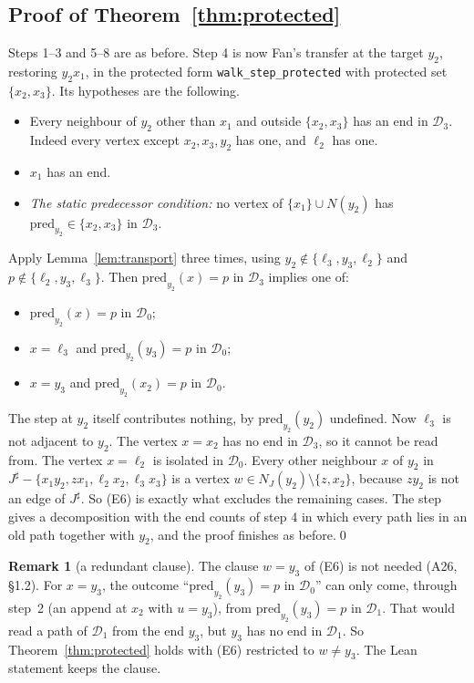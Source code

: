\documentclass[11pt]{amsart}
\theoremstyle{definition}
\newtheorem{remark}[theorem]{Remark}
\newcommand{\cD}{\mathcal D}
\newcommand{\sh}{{\sharp}}
\begin{document}
\subsection*{Proof of Theorem~\ref{thm:protected}}
Steps 1--3 and 5--8 are as before. Step 4 is now Fan's transfer at the target $y_2$, restoring
$y_2x_1$, in the protected form \texttt{walk\_step\_protected} with protected set $\{x_2,x_3\}$.
Its hypotheses are the following.
\begin{itemize}
\item Every neighbour of $y_2$ other than $x_1$ and outside $\{x_2,x_3\}$ has an end in
$\cD_3$. Indeed every vertex except $x_2,x_3,y_2$ has one, and $\ell_2$ has one.
\item $x_1$ has an end.
\item \emph{The static predecessor condition:} no vertex of $\{x_1\}\cup N(y_2)$ has
$\mathrm{pred}_{y_2}\in\{x_2,x_3\}$ in $\cD_3$.
\end{itemize}
Apply Lemma~\ref{lem:transport} three times, using $y_2\notin\{\ell_3,y_3,\ell_2\}$ and
$p\notin\{\ell_2,y_3,\ell_3\}$. Then $\mathrm{pred}_{y_2}(x)=p$ in $\cD_3$ implies one of:
\begin{itemize}
\item $\mathrm{pred}_{y_2}(x)=p$ in $\cD_0$;
\item $x=\ell_3$ and $\mathrm{pred}_{y_2}(y_3)=p$ in $\cD_0$;
\item $x=y_3$ and $\mathrm{pred}_{y_2}(x_2)=p$ in $\cD_0$.
\end{itemize}
The step at $y_2$ itself contributes nothing, by $\mathrm{pred}_{y_2}(y_2)$ undefined. Now
$\ell_3$ is not adjacent to $y_2$. The vertex $x=x_2$ has no end in $\cD_3$, so it cannot be read
from. The vertex $x=\ell_2$ is isolated in $\cD_0$. Every other neighbour $x$ of $y_2$ in
$J^\sh-\{x_1y_2,zx_1,\ell_2x_2,\ell_3x_3\}$ is a vertex $w\in N_J(y_2)\setminus\{z,x_2\}$,
because $zy_2$ is not an edge of $J^\sh$. So (E6) is exactly what excludes the remaining cases.
The step gives a decomposition with the end counts of step 4 in which every path lies in an old
path together with $y_2$, and the proof finishes as before.\qed

\begin{remark}[a redundant clause]\label{rem:e6}
The clause $w=y_3$ of (E6) is not needed (A26, \S1.2). For $x=y_3$, the outcome
``$\mathrm{pred}_{y_2}(y_3)=p$ in $\cD_0$'' can only come, through step~2 (an append at $x_2$
with $u=y_3$), from $\mathrm{pred}_{y_2}(y_3)=p$ in $\cD_1$. That would read a path of $\cD_1$
from the end $y_3$, but $y_3$ has no end in $\cD_1$. So Theorem~\ref{thm:protected} holds with
(E6) restricted to $w\ne y_3$. The Lean statement keeps the clause.
\end{remark}
\end{document}
